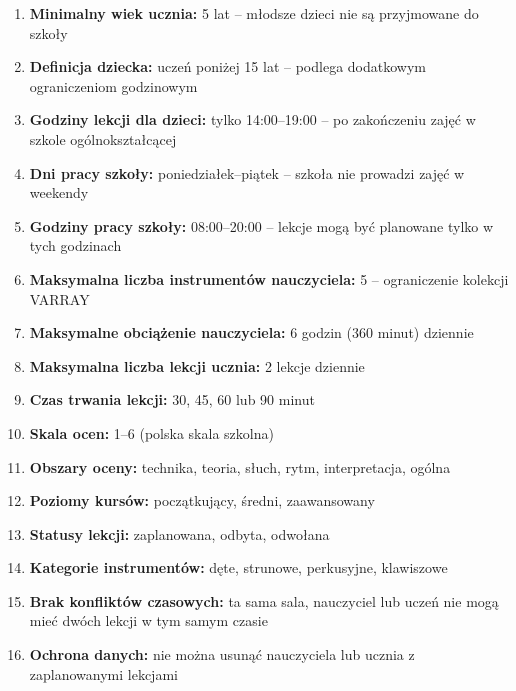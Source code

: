 \documentclass[12pt,a4paper]{article}
\begin{document}
\begin{enumerate}
    \item \textbf{Minimalny wiek ucznia:} 5 lat -- młodsze dzieci nie są przyjmowane do szkoły

    \item \textbf{Definicja dziecka:} uczeń poniżej 15 lat -- podlega dodatkowym ograniczeniom godzinowym

    \item \textbf{Godziny lekcji dla dzieci:} tylko 14:00--19:00 -- po zakończeniu zajęć w szkole ogólnokształcącej

    \item \textbf{Dni pracy szkoły:} poniedziałek--piątek -- szkoła nie prowadzi zajęć w weekendy

    \item \textbf{Godziny pracy szkoły:} 08:00--20:00 -- lekcje mogą być planowane tylko w tych godzinach

    \item \textbf{Maksymalna liczba instrumentów nauczyciela:} 5 -- ograniczenie kolekcji VARRAY

    \item \textbf{Maksymalne obciążenie nauczyciela:} 6 godzin (360 minut) dziennie

    \item \textbf{Maksymalna liczba lekcji ucznia:} 2 lekcje dziennie

    \item \textbf{Czas trwania lekcji:} 30, 45, 60 lub 90 minut

    \item \textbf{Skala ocen:} 1--6 (polska skala szkolna)

    \item \textbf{Obszary oceny:} technika, teoria, słuch, rytm, interpretacja, ogólna

    \item \textbf{Poziomy kursów:} początkujący, średni, zaawansowany

    \item \textbf{Statusy lekcji:} zaplanowana, odbyta, odwołana

    \item \textbf{Kategorie instrumentów:} dęte, strunowe, perkusyjne, klawiszowe

    \item \textbf{Brak konfliktów czasowych:} ta sama sala, nauczyciel lub uczeń nie mogą mieć dwóch lekcji w tym samym czasie

    \item \textbf{Ochrona danych:} nie można usunąć nauczyciela lub ucznia z zaplanowanymi lekcjami
\end{enumerate}
\end{document}
